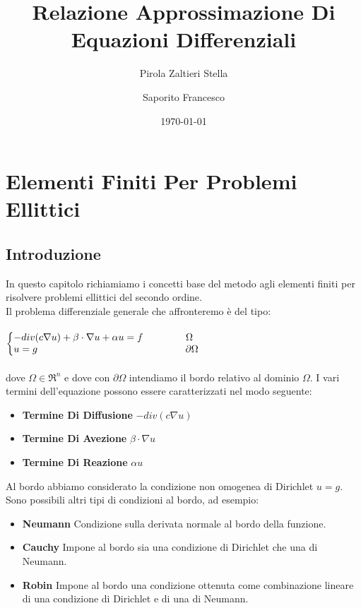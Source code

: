 \documentclass[12pt,a4paper]{report}
\author{Pirola Zaltieri Stella \and Saporito Francesco}
\title{Relazione Approssimazione Di Equazioni Differenziali}
\date{\today}
\makeatletter
\theoremstyle{theorem}
\theoremstyle{definition}
\newenvironment{system}
{\left\lbrace\begin{array}{@{}l@{}}}
{\end{array}\right.}
\makeatother
\begin{document}
\maketitle

\tableofcontents

 

\chapter{Elementi Finiti Per Problemi Ellittici}

\section{Introduzione}
In questo capitolo richiamiamo i concetti base del metodo agli elementi finiti per risolvere problemi ellittici del secondo ordine.\\
Il problema differenziale generale che affronteremo è del tipo:\\\\  \label{Problema Di Dirichlet}
\begin{math}
\begin{system}
-div(c\nabla{u})+\beta \cdot \nabla{u} + \alpha u = f \qquad \qquad \ \Omega \\
u = g \qquad \qquad \qquad \qquad \qquad \qquad \qquad \quad \partial \Omega \\
\end{system}
\end{math}
\hfill \\\\
dove $\Omega \in \Re^{n}$ e dove con $\partial \Omega$ intendiamo il bordo relativo al dominio $\Omega$. I vari termini dell'equazione possono essere caratterizzati nel modo seguente:
\begin{itemize}
	\item \textbf{Termine Di Diffusione} $-div(c\nabla{u})$
	\item \textbf{Termine Di Avezione} $\beta \cdot \nabla{u}$
	\item \textbf{Termine Di Reazione} $\alpha u$	
\end{itemize}
Al bordo abbiamo considerato la condizione non omogenea di Dirichlet $u = g$. Sono possibili altri tipi di condizioni al bordo, ad esempio:
\begin{itemize}
	\item \textbf{Neumann} Condizione sulla derivata normale al bordo della funzione.
	\item \textbf{Cauchy} Impone al bordo sia una condizione di Dirichlet che una di Neumann.
	\item \textbf{Robin} Impone al bordo una condizione ottenuta come combinazione lineare di una condizione di Dirichlet e di una di Neumann.
\end{itemize}
\end{document}
